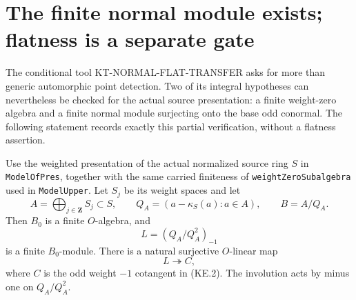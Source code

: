 \section{The finite normal module exists; flatness is a separate gate}
\label{sec:kt-projector-flatness}

The conditional tool KT-NORMAL-FLAT-TRANSFER asks for more
than generic automorphic point detection.  Two of its
integral hypotheses can nevertheless be checked for the
actual source presentation: a finite weight-zero algebra
and a finite normal module surjecting onto the base odd
conormal.  The following statement records exactly this
partial verification, without a flatness assertion.

\begin{lemma}
Use the weighted presentation of the actual normalized
source ring $S$ in \texttt{ModelOfPres}, together with the
same carried finiteness of \texttt{weightZeroSubalgebra}
used in \texttt{ModelUpper}.  Let $S_j$ be its
weight spaces and let
\[
 A=\bigoplus_{j\in\mathbf Z}S_j\subset S,
 \qquad Q_A=(a-\kappa_S(a):a\in A),
 \qquad B=A/Q_A.
                                                                  \tag{KF.1}
\]
Then $B_0$ is a finite $O$-algebra, and
\[
                 L=(Q_A/Q_A^2)_{-1}                        \tag{KF.2}
\]
is a finite $B_0$-module.  There is a natural surjective
$O$-linear map
\[
                            L\twoheadrightarrow C,         \tag{KF.3}
\]
where $C$ is the odd weight $-1$ cotangent in (KE.2).
The involution acts by minus one on $Q_A/Q_A^2$.
\end{lemma}
